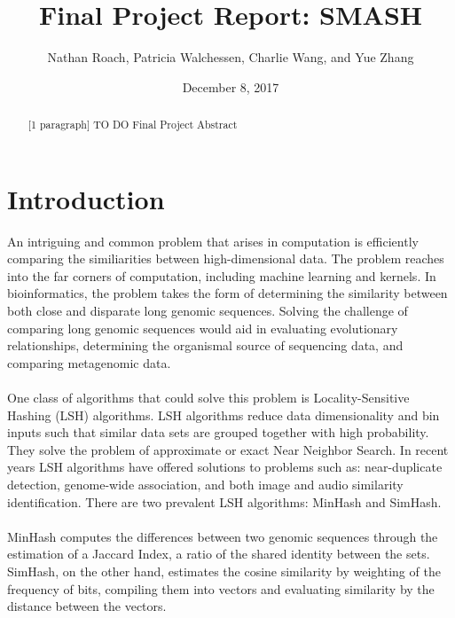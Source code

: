 \documentclass[12pt, letterpaper]{article}
\title{Final Project Report: SMASH}
\author{Nathan Roach, Patricia Walchessen, Charlie Wang, and Yue Zhang}
\date{December 8, 2017}
\begin{document}
\maketitle
\begin{abstract}
	[1 paragraph] \color{red} TO DO \color{black} Final Project Abstract
\end{abstract}

\section{Introduction}
An intriguing and common problem that arises in computation is efficiently comparing the similiarities between high-dimensional data. The problem reaches into the far corners of computation, including machine learning and kernels. In bioinformatics, the problem takes the form of determining the similarity between both close and disparate long genomic sequences. Solving the challenge of comparing long genomic sequences would aid in evaluating evolutionary relationships, determining the organismal source of sequencing data, and comparing metagenomic data. \\ \\
One class of algorithms that could solve this problem is Locality-Sensitive Hashing (LSH) algorithms. LSH algorithms reduce data dimensionality and bin inputs such that similar data sets are grouped together with high probability. They solve the problem of approximate or exact Near Neighbor Search. In recent years LSH algorithms have offered solutions to problems such as: near-duplicate detection, genome-wide association, and both image and audio similarity identification. There are two prevalent LSH algorithms: MinHash and SimHash. \\ \\
MinHash computes the differences between two genomic sequences through the estimation of a Jaccard Index, a ratio of the  shared identity between the sets. SimHash, on the other hand, estimates the cosine similarity by weighting of the frequency of bits, compiling them into vectors and evaluating similarity by the distance between the vectors.
\end{document}
